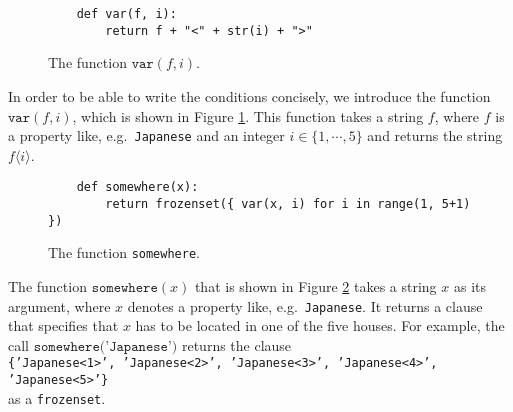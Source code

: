 \begin{figure}[!ht]
\centering
\begin{verbatim}
    def var(f, i):
        return f + "<" + str(i) + ">" 
\end{verbatim}
\vspace*{-0.3cm}
\caption{The function $\texttt{var}(f, i)$.}
\label{fig:var_f_i}
\end{figure}

In order to be able to write the conditions concisely, we introduce the function
$\texttt{var}(f, i)$, which is shown in Figure \ref{fig:var_f_i}.  This function
takes a string $f$, where $f$ is a property like, e.g.~\texttt{Japanese} and an
integer $i \in \{1,\cdots,5\}$ and returns the string $f\langle i\rangle$.




\begin{figure}[!ht]
\centering
\begin{verbatim}
    def somewhere(x):
        return frozenset({ var(x, i) for i in range(1, 5+1) })
\end{verbatim}
\vspace*{-0.3cm}
\caption{The function \texttt{somewhere}.}
\label{fig:somewhere}
\end{figure}
The function $\texttt{somewhere}(x)$ that is shown in Figure \ref{fig:somewhere}
takes a string $x$ as its argument, where $x$ denotes a property like,
e.g.~\texttt{Japanese}.  It returns a clause that specifies that $x$ has to be
located in one of the five houses.  For example,  the call
$\texttt{somewhere('Japanese')}$ returns the clause
\\[0.2cm]
\hspace*{1.3cm}
\texttt{\{'Japanese<1>', 'Japanese<2>', 'Japanese<3>', 'Japanese<4>', 'Japanese<5>'\}}
\\[0.2cm]
as a \texttt{frozenset}.

